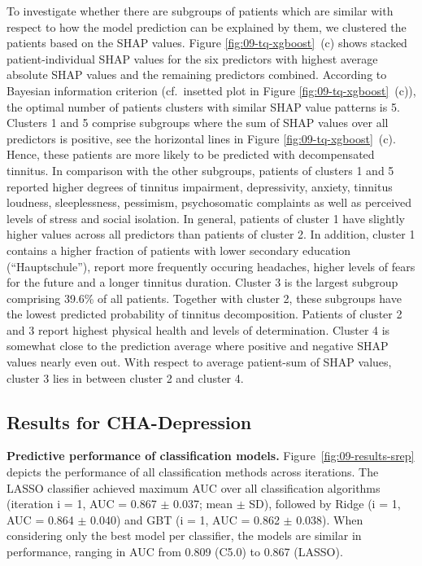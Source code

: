 \documentclass[
  oneside]{book}
\begin{document}
To investigate whether there are subgroups of patients which are similar with respect to how the model prediction can be explained by them, we clustered the patients based on the SHAP values.
Figure \ref{fig:09-tq-xgboost}~(c) shows stacked patient-individual SHAP values for the six predictors with highest average absolute SHAP values and the remaining predictors combined.
According to Bayesian information criterion (cf.~insetted plot in Figure \ref{fig:09-tq-xgboost}~(c)), the optimal number of patients clusters with similar SHAP value patterns is 5.
Clusters 1 and 5 comprise subgroups where the sum of SHAP values over all predictors is positive, see the horizontal lines in Figure \ref{fig:09-tq-xgboost}~(c).
Hence, these patients are more likely to be predicted with decompensated tinnitus.
In comparison with the other subgroups, patients of clusters 1 and 5 reported higher degrees of tinnitus impairment, depressivity, anxiety, tinnitus loudness, sleeplessness, pessimism, psychosomatic complaints as well as perceived levels of stress and social isolation.
In general, patients of cluster 1 have slightly higher values across all predictors than patients of cluster 2.
In addition, cluster 1 contains a higher fraction of patients with lower secondary education (``Hauptschule''), report more frequently occuring headaches, higher levels of fears for the future and a longer tinnitus duration.
Cluster 3 is the largest subgroup comprising 39.6\% of all patients.
Together with cluster 2, these subgroups have the lowest predicted probability of tinnitus decomposition.
Patients of cluster 2 and 3 report highest physical health and levels of determination.
Cluster 4 is somewhat close to the prediction average where positive and negative SHAP values nearly even out.
With respect to average patient-sum of SHAP values, cluster 3 lies in between cluster 2 and cluster 4.

\hypertarget{iml-results-depression}{%
\subsection{Results for CHA-Depression}\label{iml-results-depression}}

\textbf{Predictive performance of classification models.}
Figure~\ref{fig:09-results-srep} depicts the performance of all classification methods across iterations.
The LASSO classifier achieved maximum AUC over all classification algorithms (iteration i = 1, AUC = 0.867 \(\pm\) 0.037; mean \(\pm\) SD), followed by Ridge (i = 1, AUC = 0.864 \(\pm\) 0.040) and GBT (i = 1, AUC = 0.862 \(\pm\) 0.038).
When considering only the best model per classifier, the models are similar in performance, ranging in AUC from 0.809 (C5.0) to 0.867 (LASSO).
\end{document}
